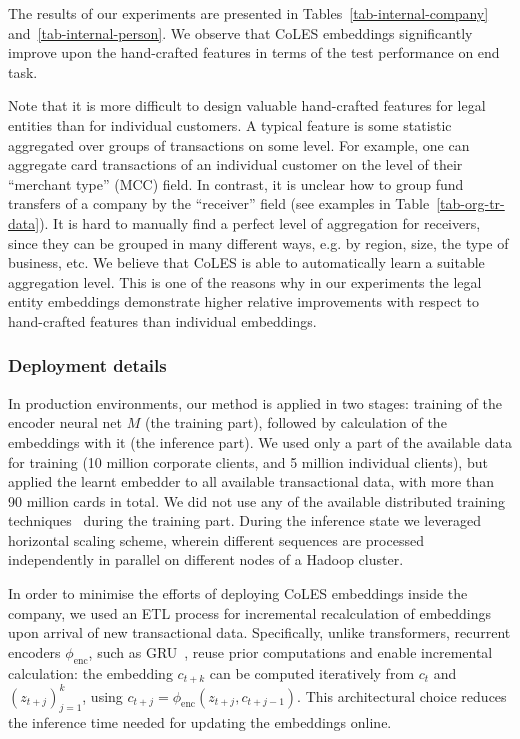 \documentclass[sigconf]{acmart}
\newcommand{\revised}[1]{#1}
\begin{document}
The results of our experiments are presented in Tables~\ref{tab-internal-company} and~\ref{tab-internal-person}.
We observe that CoLES embeddings significantly improve upon the hand-crafted features in terms
of the test performance on end task.

Note that it is more difficult to design valuable hand-crafted features for legal entities than
for individual customers. A typical feature is some statistic aggregated over groups of transactions
on some level. For example, one can aggregate card transactions of an individual customer on
the level of their ``merchant type'' (MCC) field. In contrast, it is unclear how to group fund
transfers of a company by the ``receiver'' field (see examples in Table~\ref{tab-org-tr-data}).
% 
It is hard to manually find a perfect level of aggregation for receivers, since they can be grouped
in many different ways, e.g. by region, size, the type of business, etc. We believe that CoLES is
able to automatically learn a suitable aggregation level. This is one of the reasons why in our
experiments the legal entity embeddings demonstrate higher relative improvements with respect to
hand-crafted features than individual embeddings.

\subsubsection{Deployment details} \label{sec-deployment}

\revised{
    In production environments, our method is applied in two stages:
    training of the encoder neural net $M$ (the training part), followed by calculation of
    the embeddings with it (the inference part).
    We used only a part of the available data for training (10 million corporate clients, and 5 million
    individual clients), but applied the learnt embedder to all available transactional data,
    with more than 90 million cards in total.
    We did not use any of the available distributed training techniques~\citep{Recht2011HogwildAL, Zhao2016FastAP, Kennedy2019APA} during the training part.
    During the inference state we leveraged horizontal scaling scheme, wherein different
    sequences are processed independently in parallel on different nodes of a Hadoop cluster.
}

In order to minimise the efforts of deploying CoLES embeddings inside the company, we used
an ETL process for incremental recalculation of embeddings upon arrival of new transactional data.
% 
Specifically, unlike transformers, recurrent encoders $\phi_{\mathrm{enc}}$, such as
GRU~\citep{Cho2014LearningPR}, reuse prior computations and enable incremental calculation:
the embedding $c_{t + k}$ can be computed iteratively from $c_t$ and $(z_{t+j})_{j=1}^k$,
using $c_{t + j} = \phi_{\mathrm{enc}}(z_{t + j}, c_{t+j-1})$. This architectural choice
reduces the inference time needed for updating the embeddings online. 
\end{document}
